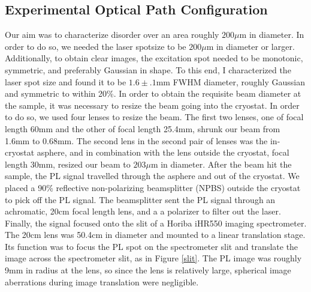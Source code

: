 \subsection{Experimental Optical Path Configuration}
\indent Our aim was to characterize disorder over an area roughly $200\mu$m in diameter. In order to do so, we needed the laser spotsize to be $200\mu$m in diameter or larger. Additionally, to obtain clear images, the excitation spot needed to be monotonic, symmetric, and preferably Gaussian in shape. To this end, I characterized the laser spot size and found it to be $1.6\pm.1$mm FWHM diameter, roughly Gaussian and symmetric to within 20\%. In order to obtain the requisite beam diameter at the sample, it was necessary to resize the beam going into the cryostat. In order to do so, we used four lenses to resize the beam. The first two lenses, one of focal length 60mm and the other of focal length 25.4mm, shrunk our beam from 1.6mm to 0.68mm. The second lens in the second pair of lenses was the in-cryostat asphere, and in combination with the lens outside the cryostat, focal length 30mm, resized our beam to $203\mu$m in diameter. After the beam hit the sample, the PL signal travelled through the asphere and out of the cryostat. We placed a 90\% reflective non-polarizing beamsplitter (NPBS) outside the cryostat to pick off the PL signal. The beamsplitter sent the PL signal through an achromatic, 20cm focal length lens, and a a polarizer to filter out the laser. Finally, the signal focused onto the slit of a Horiba iHR550 imaging spectrometer. The 20cm lens was 50.4cm in diameter and mounted to a linear translation stage. Its function was to focus the PL spot on the spectrometer slit and translate the image across the spectrometer slit, as in Figure \ref{slit}. The PL image was roughly 9mm in radius at the lens, so since the lens is relatively large, spherical image aberrations during image translation were negligible.

